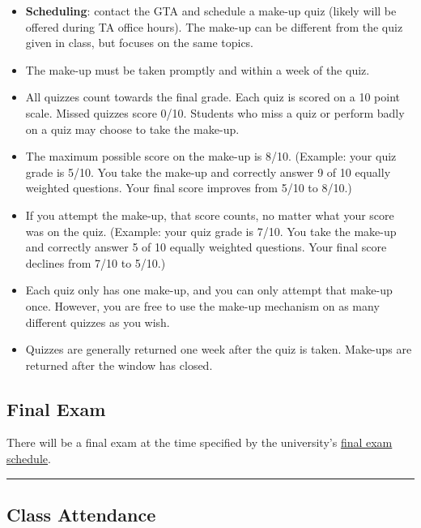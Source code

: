 \documentclass[11pt]{article}
\begin{document}
\begin{itemize}
\item \textbf{Scheduling}: contact the GTA and schedule a make-up quiz (likely will be offered during TA office hours). The make-up can be different from the quiz given in class, but focuses on the same topics.
\item
  The make-up must be taken promptly and within a week of the quiz.

\item
  All quizzes count towards the final grade. Each quiz is scored on a 10
  point scale. Missed quizzes score 0/10. Students who miss a quiz or
  perform badly on a quiz may choose to take the make-up.
\item
  The maximum possible score on the make-up is 8/10. (Example: your quiz
  grade is 5/10. You take the make-up and correctly answer 9 of 10
  equally weighted questions. Your final score improves from 5/10 to
  8/10.)
\item
  If you attempt the make-up, that score counts, no matter what your
  score was on the quiz. (Example: your quiz grade is 7/10. You take the
  make-up and correctly answer 5 of 10 equally weighted questions. Your
  final score declines from 7/10 to 5/10.)

  \item  Each quiz only has one make-up, and you can only attempt that make-up
  once. However, you are free to use the make-up mechanism on as many
  different quizzes as you wish.
\item
  Quizzes are generally returned one week after the quiz is taken.
  Make-ups are returned after the window has closed.
\end{itemize}

\subsection{Final Exam}\label{final-exam}

There will be a final exam at the time specified by the university's \href{https://registrar.gmu.edu/calendars/}{final exam schedule}.

\begin{center}\rule{0.5\linewidth}{0.5pt}\end{center}

\subsection{Class Attendance}\label{class-attendance}
\end{document}
